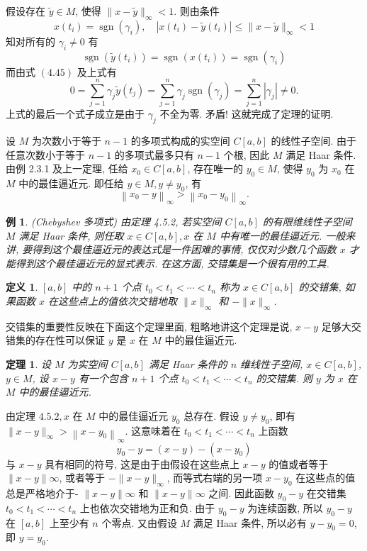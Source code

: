\documentclass[openany]{ctexbook}
\makeatletter
\theoremstyle{kaiti}
\newtheorem{definition}{定义}[section]
\newtheorem{theorem}{定理}[section]
\theoremstyle{normal}
\newtheorem{example}{例}[section]
\renewenvironment{proof}[1][\proofname]{\par
    \pushQED{\qed}%
    \normalfont \topsep6\p@\@plus6\p@\relax
    \trivlist
    \item\relax
    {\heiti #1}\hspace{2\labelsep}\ignorespaces
  }{%
    \popQED\endtrivlist\@endpefalse
  }
\makeatother
\begin{document}
\begin{proof}
假设存在 $\tilde{y} \in M$, 使得 $\|x-\tilde{y}\|_{\infty}<1$. 则由条件
$$
x\left(t_{i}\right)=\operatorname{sgn}\left(\gamma_{i}\right), \quad\left|x\left(t_{i}\right)-\tilde{y}\left(t_{i}\right)\right| \leqslant\|x-\tilde{y}\|_{\infty}<1
$$
知对所有的 $\gamma_{i} \neq 0$ 有
$$
\operatorname{sgn}\left(\widetilde{y}\left(t_{i}\right)\right)=\operatorname{sgn}\left(x\left(t_{i}\right)\right)=\operatorname{sgn}\left(\gamma_{i}\right)
$$
而由式 $(4.45)$ 及上式有
$$
0=\sum_{j=1}^n \gamma_{j} \widetilde{y}\left(t_{j}\right)=\sum_{j=1}^n \gamma_{j} \operatorname{sgn}\left(\gamma_{j}\right)=\sum_{j=1}^n\left|\gamma_{j}\right| \neq 0.
$$
上式的最后一个式子成立是由于 $\gamma_{j}$ 不全为零. 矛盾! 这就完成了定理的证明.
\end{proof}

设 $M$ 为次数小于等于 $n-1$ 的多项式构成的实空间 $C[a, b]$ 的线性子空间. 由于任意次数小于等于 $n-1$ 的多项式最多只有 $n-1$ 个根, 因此 $M$ 满足 Haar 条件. 由例 2.3.1 及上一定理, 任给 $x_0 \in C[a, b]$, 存在唯一的 $y_0 \in M$, 使得 $y_0$ 为 $x_0$ 在 $M$ 中的最佳逼近元. 即任给 $y \in M, y \neq y_0$, 有
$$
\left\|x_0-y\right\|_{\infty}>\left\|x_0-y_0\right\|_{\infty}.
$$

\begin{example}
(Chebyshev 多项式) 由定理 4.5.2, 若实空间 $C[a, b]$ 的有限维线性子空间 $M$ 满足 Haar 条件, 则任取 $x \in C[a, b], x$ 在 $M$ 中有唯一的最佳逼近元. 一般来讲, 要得到这个最佳逼近元的表达式是一件困难的事情, 仅仅对少数几个函数 $x$ 才能得到这个最佳逼近元的显式表示. 在这方面, 交错集是一个很有用的工具.
\end{example}

\begin{definition}
$[a, b]$ 中的 $n+1$ 个点 $t_0<t_1<\cdots<t_n$ 称为 $x \in C[a, b]$ 的交错集, 如果函数 $x$ 在这些点上的值依次交错地取 $\|x\|_{\infty}$ 和 $-\|x\|_{\infty}$.
\end{definition}

交错集的重要性反映在下面这个定理里面, 粗略地讲这个定理是说, $x-y$ 足够大交错集的存在性可以保证 $y$ 是 $x$ 在 $M$ 中的最佳逼近元.

\begin{theorem}
设 $M$ 为实空间 $C[a, b]$ 满足 Haar 条件的 $n$ 维线性子空间, $x \in C[a, b]$, $y \in M$, 设 $x-y$ 有一个包含 $n+1$ 个点 $t_0<t_1<\cdots<t_n$ 的交错集. 则 $y$ 为 $x$ 在 $M$ 中的最佳逼近元.
\end{theorem}

\begin{proof}
由定理 $4.5.2, x$ 在 $M$ 中的最佳逼近元 $y_0$ 总存在. 假设 $y \neq y_0$, 即有 $\|x-y\|_{\infty}>\left\|x-y_0\right\|_{\infty}.$
这意味着在 $t_0<t_1<\cdots<t_n$ 上函数
$$
y_0-y=(x-y)-\left(x-y_0\right)
$$
与 $x-y$ 具有相同的符号, 这是由于由假设在这些点上 $x-y$ 的值或者等于 $\|x-y\| \infty$, 或者等于 $-\|x-y\|_{\infty}$, 而等式右端的另一项 $x-y_0$ 在这些点的值总是严格地介于- $\|x-y\| \infty$ 和 $\|x-y\| \infty$ 之间. 因此函数 $y_0-y$ 在交错集 $t_0<t_1<\cdots<t_n$ 上也依次交错地为正和负. 由于 $y_0-y$ 为连续函数, 所以 $y_0-y$ 在 $[a, b]$ 上至少有 $n$ 个零点. 又由假设 $M$ 满足 Haar 条件, 所以必有 $y-y_0=0$, 即 $y=y_0$.
\end{proof}
\end{document}

